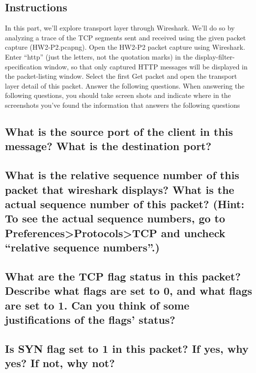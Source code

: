 \documentclass{assignment-x}
\begin{document}
\subsection{Instructions}
In this part, we'll explore transport layer through Wireshark. We'll do so by analyzing a trace of
the TCP segments sent and received using the given packet capture (HW2-P2.pcapng).
Open the HW2-P2 packet capture using Wireshark.
Enter “http” (just the letters, not the quotation marks) in the display-filter-specification
window, so that only captured HTTP messages will be displayed in the packet-listing
window.
Select the first Get packet and open the transport layer detail of this packet.
Answer the following questions. When answering the following questions, you should take
screen shots and indicate where in the screenshots you've found the information that
answers the following questions

\subsection{What is the source port of the client in this message? What is the destination port?}
\subsection{What is the relative sequence number of this packet that wireshark displays? What is the
actual sequence number of this packet? (Hint: To see the actual sequence numbers, go to
Preferences>Protocols>TCP and uncheck “relative sequence numbers”.)}
\subsection{What are the TCP flag status in this packet? Describe what flags are set to 0, and what
flags are set to 1. Can you think of some justifications of the flags’ status?}
\subsection{Is SYN flag set to 1 in this packet? If yes, why yes? If not, why not?}
\end{document}
